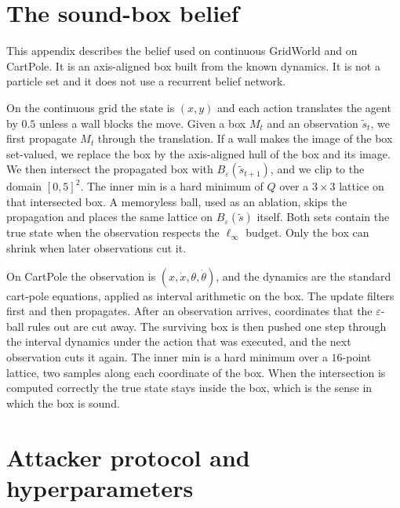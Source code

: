 \documentclass[10pt,twocolumn]{article}
\begin{document}
\appendix

\section{The sound-box belief}
\label{app:box}

This appendix describes the belief used on continuous GridWorld and on CartPole.
It is an axis-aligned box built from the known dynamics.
It is not a particle set and it does not use a recurrent belief network.

On the continuous grid the state is $(x,y)$ and each action translates the agent by $0.5$ unless a wall blocks the move.
Given a box $M_t$ and an observation $\tilde s_t$, we first propagate $M_t$ through the translation.
If a wall makes the image of the box set-valued, we replace the box by the axis-aligned hull of the box and its image.
We then intersect the propagated box with $B_\varepsilon(\tilde s_{t+1})$, and we clip to the domain $[0,5]^2$.
The inner min is a hard minimum of $Q$ over a $3{\times}3$ lattice on that intersected box.
A memoryless ball, used as an ablation, skips the propagation and places the same lattice on $B_\varepsilon(\tilde s)$ itself.
Both sets contain the true state when the observation respects the $\ell_\infty$ budget.
Only the box can shrink when later observations cut it.

On CartPole the observation is $(x,\dot x,\theta,\dot\theta)$, and the dynamics are the standard cart-pole equations, applied as interval arithmetic on the box.
The update filters first and then propagates.
After an observation arrives, coordinates that the $\varepsilon$-ball rules out are cut away.
The surviving box is then pushed one step through the interval dynamics under the action that was executed, and the next observation cuts it again.
The inner min is a hard minimum over a $16$-point lattice, two samples along each coordinate of the box.
When the intersection is computed correctly the true state stays inside the box, which is the sense in which the box is sound.

\section{Attacker protocol and hyperparameters}
\label{app:hyper}
\end{document}
